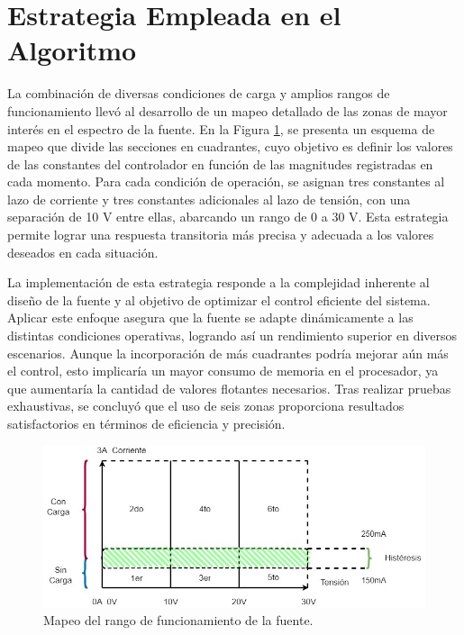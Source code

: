 \section{Estrategia Empleada en el Algoritmo}
La combinación de diversas condiciones de carga y amplios rangos de funcionamiento llevó al desarrollo de un mapeo detallado de las zonas de mayor interés en el espectro de la fuente. En la Figura \ref{F:mapeo_cuadrantes}, se presenta un esquema de mapeo que divide las secciones en cuadrantes, cuyo objetivo es definir los valores de las constantes del controlador en función de las magnitudes registradas en cada momento. Para cada condición de operación, se asignan tres constantes al lazo de corriente y tres constantes adicionales al lazo de tensión, con una separación de 10 V entre ellas, abarcando un rango de 0 a 30 V. Esta estrategia permite lograr una respuesta transitoria más precisa y adecuada a los valores deseados en cada situación. \par

La implementación de esta estrategia responde a la complejidad inherente al diseño de la fuente y al objetivo de optimizar el control eficiente del sistema. Aplicar este enfoque asegura que la fuente se adapte dinámicamente a las distintas condiciones operativas, logrando así un rendimiento superior en diversos escenarios. Aunque la incorporación de más cuadrantes podría mejorar aún más el control, esto implicaría un mayor consumo de memoria en el procesador, ya que aumentaría la cantidad de valores flotantes necesarios. Tras realizar pruebas exhaustivas, se concluyó que el uso de seis zonas proporciona resultados satisfactorios en términos de eficiencia y precisión.\par


\begin{figure}[H]
    \centering
    \includegraphics[width=1\textwidth]{./imagenes/matriz.jpg}
    \caption{Mapeo del rango de funcionamiento de la fuente.}
    \label{F:mapeo_cuadrantes}
\end{figure}\par

